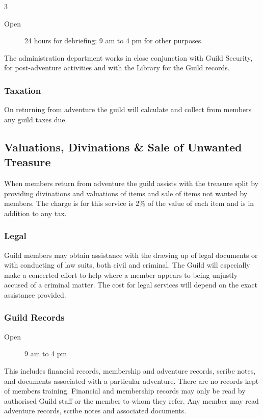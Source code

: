 \begin{multicols}{3}
\begin{description}
\item[Open] 24 hours for debriefing; 9 am to 4 pm
  for other purposes.
\end{description}

The administration department works in close conjunction with Guild
Security, for post-adventure activities and with the Library for the
Guild records.

\subsubsection{Taxation}

On returning from adventure the guild will calculate and collect from
members any guild taxes due.

\subsection{Valuations, Divinations \& Sale of Unwanted Treasure}

When members return from adventure the guild assists with the treasure
split by providing divinations and valuations of items and sale of
items not wanted by members.  The charge is for this service is 2\% of
the value of each item and is in addition to any tax.

\subsubsection{Legal}

Guild members may obtain assistance with the drawing up of legal
documents or with conducting of law suits, both civil and
criminal. The Guild will especially make a concerted effort to help
where a member appears to being unjustly accused of a criminal
matter. The cost for legal services will depend on the exact
assistance provided.

\subsubsection{Guild Records}

\begin{description}
\item[Open] 9 am to 4 pm
\end{description}

This includes financial records, membership and adventure records,
scribe notes, and documents associated with a particular adventure.
There are no records kept of members training. Financial and
membership records may only be read by authorised Guild staff or the
member to whom they refer. Any member may read adventure records,
scribe notes and associated documents.


\end{multicols}
